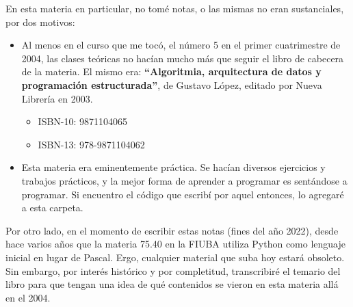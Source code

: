 \documentclass{article}
\begin{document}
En esta materia en particular, no tomé notas, o las mismas no eran sustanciales, por dos motivos:

\begin{itemize}
\item Al menos en el curso que me tocó, el número 5 en el primer cuatrimestre de 2004, las clases teóricas no hacían mucho más que seguir el libro de cabecera de la materia. El mismo era: \textbf{``Algoritmia, arquitectura de datos y programación estructurada''}, de Gustavo López, editado por Nueva Librería en 2003.
	\begin{itemize}
	\item ISBN-10: 9871104065
	\item ISBN-13: 978-9871104062
	\end{itemize}
\item Esta materia era eminentemente práctica. Se hacían diversos ejercicios y trabajos prácticos, y la mejor forma de aprender a programar es sentándose a programar. Si encuentro el código que escribí por aquel entonces, lo agregaré a esta carpeta.
\end{itemize}

Por otro lado, en el momento de escribir estas notas (fines del año 2022), desde hace varios años que la materia 75.40 en la FIUBA utiliza Python como lenguaje inicial en lugar de Pascal. Ergo, cualquier material que suba hoy estará obsoleto. Sin embargo, por interés histórico y por completitud, transcribiré el temario del libro para que tengan una idea de qué contenidos se vieron en esta materia allá en el 2004.
\end{document}
